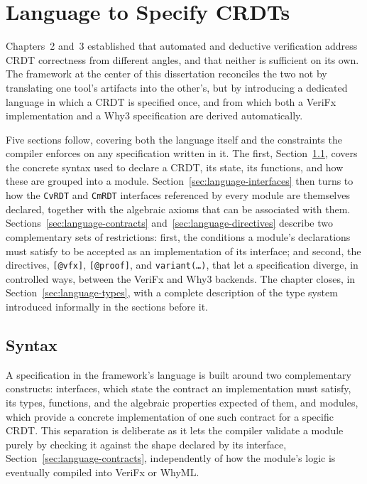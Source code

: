 
%

\chapter{Language to Specify CRDTs}
\label{cha:language}

Chapters~2 and~3 established that automated and deductive verification address CRDT correctness from different angles, and
that neither is sufficient on its own. The framework at the center of this dissertation reconciles the two not by
translating one tool's artifacts into the other's, but by introducing a dedicated language in which a CRDT is specified
once, and from which both a VeriFx implementation and a Why3 specification are derived automatically.

Five sections follow, covering both the language itself and the constraints the compiler enforces on any specification
written in it. The first, Section~\ref{sec:syntax}, covers the concrete syntax used to declare a CRDT, its state, its
functions, and how these are grouped into a module. Section~\ref{sec:language-interfaces} then turns to how the
\texttt{CvRDT} and \texttt{CmRDT} interfaces referenced by every module are themselves declared, together with the
algebraic axioms that can be associated with them. Sections~\ref{sec:language-contracts} and~\ref{sec:language-directives}
describe two complementary sets of restrictions: first, the conditions a module's declarations must satisfy to be accepted
as an implementation of its interface; and second, the directives, \texttt{[@vfx]}, \texttt{[@proof]}, and
\texttt{variant(…)}, that let a specification diverge, in controlled ways, between the VeriFx and Why3 backends. The
chapter closes, in Section~\ref{sec:language-types}, with a complete description of the type system introduced informally
in the sections before it.

\section{Syntax}
\label{sec:syntax}

A specification in the framework's language is built around two complementary constructs: interfaces,
which state the contract an implementation must satisfy, its types, functions, and the algebraic properties expected of
them, and modules, which provide a concrete implementation of one such contract for a specific CRDT. This separation is
deliberate as it lets the compiler validate a module purely by checking it against the shape declared by its interface,
Section~\ref{sec:language-contracts}, independently of how the module's logic is eventually compiled into VeriFx or WhyML.

